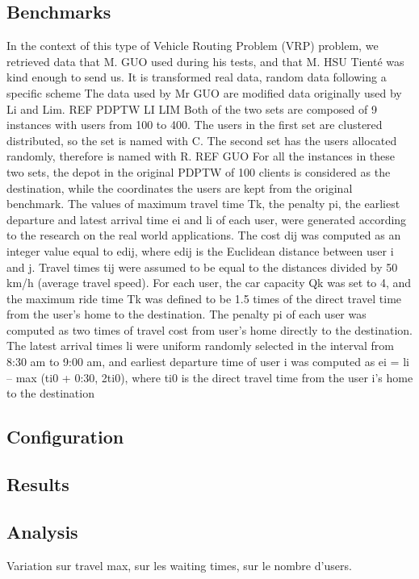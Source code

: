 \documentclass[12pt, a4paper,twoside]{memoir}
\begin{document}
	\subsection{Benchmarks}
	In the context of this type of Vehicle Routing Problem (VRP) problem, we retrieved data that M. GUO used during his tests, and that M. HSU Tienté was kind enough to send us.
	It is transformed real data, random data following a specific scheme 
	The data used by Mr GUO are modified data originally used by Li and Lim.
	REF PDPTW LI LIM
	Both of the two sets are composed of 9 instances with users from 100 to 400. The users in the first set are clustered distributed, so the set is named with C. The second set has the users allocated randomly, therefore is named with R.
	REF GUO
	For all the instances in these two sets, the depot in the original PDPTW of 100 clients is considered as the destination, while the coordinates the users are kept from the original benchmark. The values of maximum travel time Tk, the penalty pi, the earliest departure and latest arrival time ei and li of each user, were generated according to the research on the real world applications. The cost dij was computed as an integer value equal to edij, where edij is the Euclidean distance between user i and j. Travel times tij were assumed to be equal to the distances divided by 50 km/h (average travel speed). For each user, the car capacity Qk was set to 4, and the maximum ride time Tk was defined to be 1.5 times of the direct travel time from the user’s home to the destination. The penalty pi of each user was computed as two times of travel cost from user’s home directly to the destination. The latest arrival times li were uniform randomly selected in the interval from 8:30 am to 9:00 am, and earliest departure time of user i was computed as ei = li – max (ti0 + 0:30, 2ti0), where ti0 is the direct travel time from the user i’s home to the destination
	\subsection{Configuration}
	\subsection{Results}
	\subsection{Analysis}
	Variation sur travel max, sur les waiting times, sur le nombre d'users.
	
\end{document}
